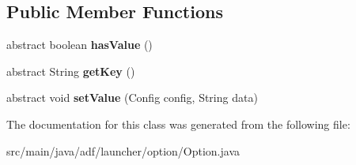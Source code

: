 \subsection*{Public Member Functions}
\begin{DoxyCompactItemize}
\item 
\hypertarget{classadf_1_1launcher_1_1option_1_1Option_ad5329cdcad9238d6b87e240032824027}{}\label{classadf_1_1launcher_1_1option_1_1Option_ad5329cdcad9238d6b87e240032824027} 
abstract boolean {\bfseries has\+Value} ()
\item 
\hypertarget{classadf_1_1launcher_1_1option_1_1Option_a431b4045399a237a4e425e7525552847}{}\label{classadf_1_1launcher_1_1option_1_1Option_a431b4045399a237a4e425e7525552847} 
abstract String {\bfseries get\+Key} ()
\item 
\hypertarget{classadf_1_1launcher_1_1option_1_1Option_a10c349e32a8cce2828fbc71ab3027bd5}{}\label{classadf_1_1launcher_1_1option_1_1Option_a10c349e32a8cce2828fbc71ab3027bd5} 
abstract void {\bfseries set\+Value} (Config config, String data)
\end{DoxyCompactItemize}


The documentation for this class was generated from the following file\+:\begin{DoxyCompactItemize}
\item 
src/main/java/adf/launcher/option/Option.\+java\end{DoxyCompactItemize}
